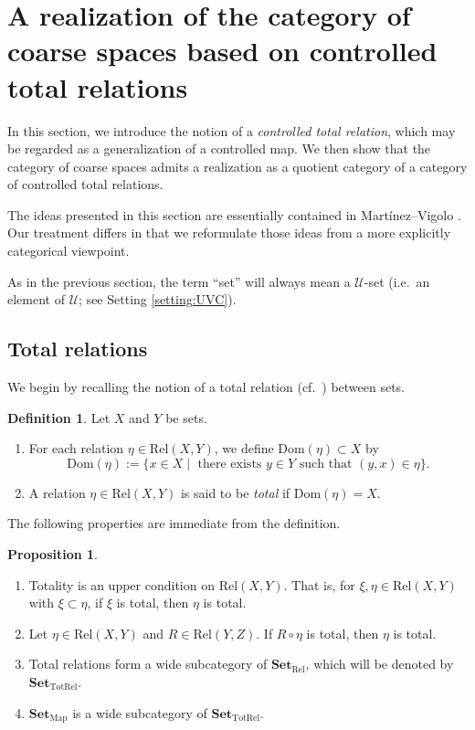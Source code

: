 \documentclass[12pt, a4paper]{amsart}
\theoremstyle{definition}
\newtheorem{proposition}[theorem]{Proposition}
\newtheorem{definition}[theorem]{Definition}
\newcommand{\Rel}{\mathrm{Rel}}
\newcommand{\map}{\mathrm{Map}}
\newcommand{\TotRel}{\mathrm{TotRel}}
\newcommand{\Dom}{\mathrm{Dom}}
\newcommand{\Set}{{\mathbf{Set}}}
\begin{document}
\section{A realization of the category of coarse spaces based on controlled total relations}\label{section:realizationCtrTotRel}

In this section, we introduce the notion of a \emph{controlled total relation},
which may be regarded as a generalization of a controlled map.
We then show that the category of coarse spaces admits a realization as a
quotient category of a category of controlled total relations.

The ideas presented in this section are essentially contained in
Mart\'{i}nez--Vigolo \cite{MartinezVigolo2026roe}.
Our treatment differs in that we reformulate those ideas from a more
explicitly categorical viewpoint.

As in the previous section, the term ``set'' will always mean a
$\mathcal{U}$-set (i.e.~an element of $\mathcal{U}$; see Setting
\ref{setting:UVC}).

\subsection{Total relations}

We begin by recalling the notion of a total relation (cf.~\cite{BerghammerFurusawaGuttmannHofner2020Rel}) between sets. 


\begin{definition}
Let $X$ and $Y$ be sets.
\begin{enumerate}
    \item For each relation $\eta \in \Rel(X,Y)$, we define $\Dom(\eta) \subset X$ by 
    \[
    \Dom(\eta) := \{ x \in X \mid \text{ there exists } y \in Y \text{ such that }(y,x) \in \eta \}.
    \]
    \item A relation $\eta\in\Rel(X,Y)$ is said to be \emph{total} if $\Dom(\eta) = X$.
\end{enumerate}
\end{definition}

The following properties are immediate from the definition.

\begin{proposition}\label{proposition:total_basic}
\begin{enumerate}
\item
Totality is an upper condition on $\Rel(X,Y)$.
That is, for $\xi,\eta\in\Rel(X,Y)$ with $\xi\subset\eta$,
if $\xi$ is total, then $\eta$ is total.

\item \label{item:total_basic:totalleftrem}
Let $\eta\in\Rel(X,Y)$ and $R\in\Rel(Y,Z)$.
If $R\circ\eta$ is total, then $\eta$ is total.

\item
Total relations form a wide subcategory of $\Set_{\Rel}$, which will be
denoted by $\Set_{\TotRel}$.

\item
$\Set_{\map}$ is a wide subcategory of $\Set_{\TotRel}$.
\end{enumerate}
\end{proposition}
\end{document}
